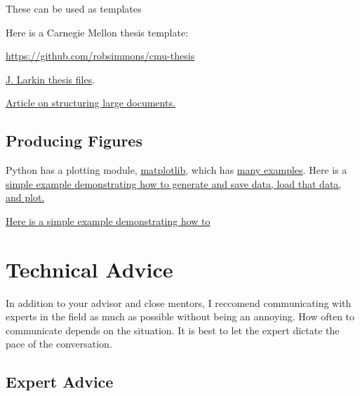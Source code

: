 These can be used as templates

Here is a Carnegie Mellon thesis template:

\href{https://github.com/robsimmons/cmu-thesis}
{https://github.com/robsimmons/cmu-thesis}

\href{https://github.com/jasonlarkin/thesis/tree/master/thesis}
{J. Larkin thesis files}.

\href{http://web.science.mq.edu.au/~rdale/resources/writingnotes/latexstruct.html}
{Article on structuring large documents.}


\subsection{Producing Figures}

Python has a plotting module, \href{http://matplotlib.org/}{matplotlib}, 
which has \href{http://matplotlib.org/examples/index.html}{many examples}. 
Here is a \href{https://gist.github.com/kparrish/6101681}{simple example 
demonstrating how to generate and save data, load that data, and plot.} 


\href{https://github.com/ntpl/ntpy/tree/master/examples/thesis}
{Here is a simple example demonstrating how to }

\section{Technical Advice}

In addition to your advisor and close mentors, 
I reccomend communicating with experts in the field as much as 
possible without being an annoying.  How often to 
communicate depends on the situation. 
It is best to let the expert dictate the pace of the conversation. 

\subsection{Expert Advice}

